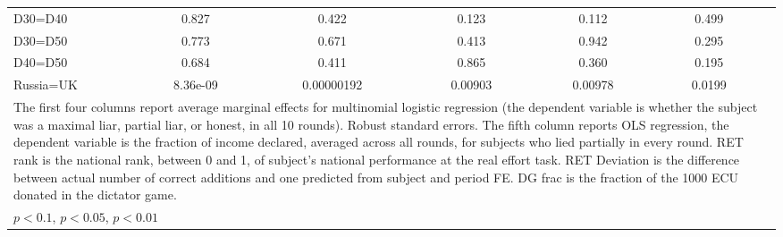 \begin{tabular}{l|cccccccc|cc}
D30=D40         &    0.827         &         &    0.422         &         &    0.123         &         &    0.112         &         &    0.499         &         \\
D30=D50         &    0.773         &         &    0.671         &         &    0.413         &         &    0.942         &         &    0.295         &         \\
D40=D50         &    0.684         &         &    0.411         &         &    0.865         &         &    0.360         &         &    0.195         &         \\
Russia=UK       & 8.36e-09         &         &0.00000192         &         &  0.00903         &         &  0.00978         &         &   0.0199         &         \\
\hline\hline
\multicolumn{11}{p{16.5cm}}{\tiny The first four columns report average marginal effects for multinomial logistic regression (the dependent variable is whether the subject was a maximal liar, partial liar, or honest, in all 10 rounds). Robust standard errors. The fifth column reports OLS regression, the dependent variable is the fraction of income declared, averaged across all rounds, for subjects who lied partially in every round. RET rank is the national rank, between 0 and 1, of subject's national performance at the real effort task. RET Deviation is the difference between actual number of correct additions and one predicted from subject and period FE. DG frac is the fraction of the 1000 ECU donated in the dictator game.}\\
\multicolumn{11}{l}{\tiny \sym{*} \(p<0.1\), \sym{**} \(p<0.05\), \sym{***} \(p<0.01\)}\\
\end{tabular}